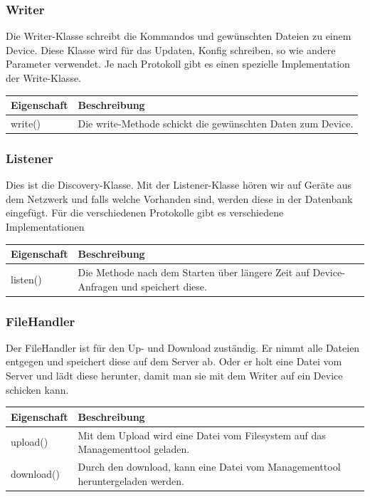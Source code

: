 \subsubsection{Writer}
Die Writer-Klasse schreibt die Kommandos und gewünschten Dateien zu einem Device. Diese Klasse wird für das Updaten, Konfig schreiben, so wie andere Parameter verwendet. Je nach Protokoll gibt es einen spezielle Implementation der Write-Klasse.
\noindent \begin{table}[H]
\centering
    \begin{tabular}{@{}l p{14.1cm} @{}}\toprule    
    {Eigenschaft} & {Beschreibung}\\ \midrule      
    write() & Die write-Methode schickt die gewünschten Daten zum Device. \\
    \bottomrule
    \end{tabular}
\end{table}


\subsubsection{Listener}
Dies ist die Discovery-Klasse. Mit der Listener-Klasse hören wir auf Geräte aus dem Netzwerk und falls welche Vorhanden sind, werden diese in der Datenbank eingefügt. Für die verschiedenen Protokolle gibt es verschiedene Implementationen
\begin{table}[H]
\centering
    \begin{tabular}{@{}l p{14.1cm} @{}}\toprule    
    {Eigenschaft} & {Beschreibung}\\ \midrule
    listen() &  Die Methode nach dem Starten über längere Zeit auf Device-Anfragen und speichert diese.\\
    \bottomrule
    \end{tabular}
\end{table}



\subsubsection{FileHandler}
Der FileHandler ist für den Up- und Download zuständig. Er nimmt alle Dateien entgegen und speichert diese auf dem Server ab. Oder er holt eine Datei vom Server und lädt diese herunter, damit man sie mit dem Writer auf ein Device schicken kann.
\begin{table}[H]
\centering
    \begin{tabular}{@{}l p{14.1cm} @{}}\toprule    
    {Eigenschaft} & {Beschreibung}\\ \midrule 
    upload() & Mit dem Upload wird eine Datei vom Filesystem auf das Managementtool geladen. \\
    download() & Durch den download, kann eine Datei vom Managementtool heruntergeladen werden. \\
    \bottomrule
    \end{tabular}
\end{table}

